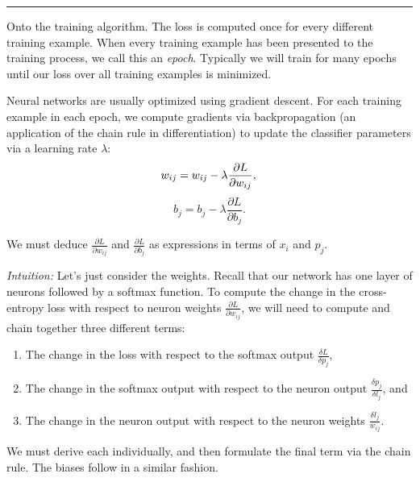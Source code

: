 \hspace{\fill}\rule{0.5\linewidth}{.5pt}\hspace{\fill}

Onto the training algorithm. The loss is computed once for every different training example. When every training example has been presented to the training process, we call this an \emph{epoch}. Typically we will train for many epochs until our loss over all training examples is minimized.

Neural networks are usually optimized using gradient descent. For each training example in each epoch, we compute gradients via backpropagation (an application of the chain rule in differentiation) to update the classifier parameters via a learning rate $\lambda$:
\begin{equation}
w_{ij} = w_{ij} - \lambda\frac{\partial L}{\partial w_{ij}}, \\
\end{equation}
\begin{equation}
b_j = b_j - \lambda\frac{\partial L}{\partial b_j}.
\end{equation}

We must deduce $\frac{\partial L}{\partial w_{ij}}$ and $\frac{\partial L}{\partial b_j}$ as expressions in terms of $x_i$ and $p_j$.

\emph{Intuition:} Let's just consider the weights. Recall that our network has one layer of neurons followed by a softmax function. To compute the change in the cross-entropy loss with respect to neuron weights $\frac{\partial L}{\partial w_{ij}}$, we will need to compute and chain together three different terms:
\begin{enumerate}
\itemsep0em
\listparindent0em
\topsep0em
\parsep0em
\partopsep0em
\item The change in the loss with respect to the softmax output $\frac{\delta L}{\delta p_j}$,
\item The change in the softmax output with respect to the neuron output $\frac{\delta p_j}{\delta l_j}$, and
\item The change in the neuron output with respect to the neuron weights $\frac{\delta l_j}{w_{ij}}$.
\end{enumerate}
We must derive each individually, and then formulate the final term via the chain rule. The biases follow in a similar fashion.

